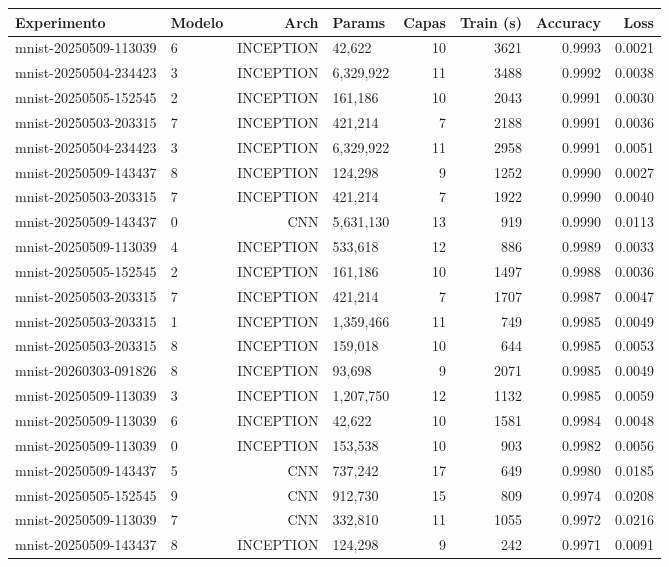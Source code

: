 \begin{tabular}{llrlrrrr}
\toprule
Experimento & Modelo & Arch & Params & Capas & Train (s) & Accuracy & Loss \\
\midrule
mnist-20250509-113039 & 6 & INCEPTION & 42,622 & 10 & 3621 & 0.9993 & 0.0021 \\
mnist-20250504-234423 & 3 & INCEPTION & 6,329,922 & 11 & 3488 & 0.9992 & 0.0038 \\
mnist-20250505-152545 & 2 & INCEPTION & 161,186 & 10 & 2043 & 0.9991 & 0.0030 \\
mnist-20250503-203315 & 7 & INCEPTION & 421,214 & 7 & 2188 & 0.9991 & 0.0036 \\
mnist-20250504-234423 & 3 & INCEPTION & 6,329,922 & 11 & 2958 & 0.9991 & 0.0051 \\
mnist-20250509-143437 & 8 & INCEPTION & 124,298 & 9 & 1252 & 0.9990 & 0.0027 \\
mnist-20250503-203315 & 7 & INCEPTION & 421,214 & 7 & 1922 & 0.9990 & 0.0040 \\
mnist-20250509-143437 & 0 & CNN & 5,631,130 & 13 & 919 & 0.9990 & 0.0113 \\
mnist-20250509-113039 & 4 & INCEPTION & 533,618 & 12 & 886 & 0.9989 & 0.0033 \\
mnist-20250505-152545 & 2 & INCEPTION & 161,186 & 10 & 1497 & 0.9988 & 0.0036 \\
mnist-20250503-203315 & 7 & INCEPTION & 421,214 & 7 & 1707 & 0.9987 & 0.0047 \\
mnist-20250503-203315 & 1 & INCEPTION & 1,359,466 & 11 & 749 & 0.9985 & 0.0049 \\
mnist-20250503-203315 & 8 & INCEPTION & 159,018 & 10 & 644 & 0.9985 & 0.0053 \\
mnist-20260303-091826 & 8 & INCEPTION & 93,698 & 9 & 2071 & 0.9985 & 0.0049 \\
mnist-20250509-113039 & 3 & INCEPTION & 1,207,750 & 12 & 1132 & 0.9985 & 0.0059 \\
mnist-20250509-113039 & 6 & INCEPTION & 42,622 & 10 & 1581 & 0.9984 & 0.0048 \\
mnist-20250509-113039 & 0 & INCEPTION & 153,538 & 10 & 903 & 0.9982 & 0.0056 \\
mnist-20250509-143437 & 5 & CNN & 737,242 & 17 & 649 & 0.9980 & 0.0185 \\
mnist-20250505-152545 & 9 & CNN & 912,730 & 15 & 809 & 0.9974 & 0.0208 \\
mnist-20250509-113039 & 7 & CNN & 332,810 & 11 & 1055 & 0.9972 & 0.0216 \\
mnist-20250509-143437 & 8 & INCEPTION & 124,298 & 9 & 242 & 0.9971 & 0.0091 \\

\end{tabular}
